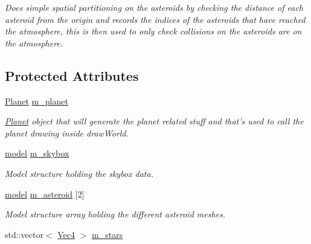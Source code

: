 \begin{DoxyCompactItemize}
\begin{DoxyCompactList}\small\item\em Does simple spatial partitioning on the asteroids by checking the distance of each asteroid from the origin and records the indices of the asteroids that have reached the atmosphere, this is then used to only check collisions on the asteroids are on the atmosphere. \item\end{DoxyCompactList}\end{DoxyCompactItemize}
\subsection*{Protected Attributes}
\begin{DoxyCompactItemize}
\item 
\hypertarget{classWorld_a1c649fe8a19a048d4ca131578101cbda}{
\hyperlink{classPlanet}{Planet} \hyperlink{classWorld_a1c649fe8a19a048d4ca131578101cbda}{m\_\-planet}}
\label{classWorld_a1c649fe8a19a048d4ca131578101cbda}

\begin{DoxyCompactList}\small\item\em \hyperlink{classPlanet}{Planet} object that will generate the planet related stuff and that's used to call the planet drawing inside drawWorld. \item\end{DoxyCompactList}\item 
\hypertarget{classWorld_afb63c8c2786c5ca075117390da41b686}{
\hyperlink{structmodel}{model} \hyperlink{classWorld_afb63c8c2786c5ca075117390da41b686}{m\_\-skybox}}
\label{classWorld_afb63c8c2786c5ca075117390da41b686}

\begin{DoxyCompactList}\small\item\em Model structure holding the skybox data. \item\end{DoxyCompactList}\item 
\hypertarget{classWorld_a18712977dcb95653341b40dced1fd4e0}{
\hyperlink{structmodel}{model} \hyperlink{classWorld_a18712977dcb95653341b40dced1fd4e0}{m\_\-asteroid} \mbox{[}2\mbox{]}}
\label{classWorld_a18712977dcb95653341b40dced1fd4e0}

\begin{DoxyCompactList}\small\item\em Model structure array holding the different asteroid meshes. \item\end{DoxyCompactList}\item 
\hypertarget{classWorld_af09067d4e919fda4125856b3b392dfbd}{
std::vector$<$ \hyperlink{classVec4}{Vec4} $>$ \hyperlink{classWorld_af09067d4e919fda4125856b3b392dfbd}{m\_\-stars}}
\label{classWorld_af09067d4e919fda4125856b3b392dfbd}


\end{DoxyCompactItemize}
